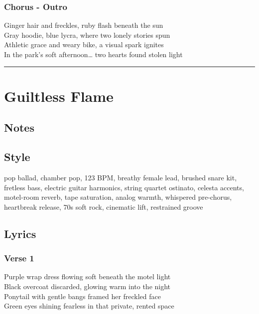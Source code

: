 \subsubsection{Chorus - Outro}\label{chorus---outro-4}

Ginger hair and freckles, ruby flash beneath the sun\\
Gray hoodie, blue lycra, where two lonely stories spun\\
Athletic grace and weary bike, a visual spark ignites\\
In the park's soft afternoon\ldots{} two hearts found stolen light

\begin{center}\rule{0.5\linewidth}{0.5pt}\end{center}

\section{Guiltless Flame}\label{guiltless-flame}

\subsection{Notes}\label{notes-36}

\subsection{Style}\label{style-35}

pop ballad, chamber pop, 123 BPM, breathy female lead, brushed snare
kit, fretless bass, electric guitar harmonics, string quartet ostinato,
celesta accents, motel-room reverb, tape saturation, analog warmth,
whispered pre-chorus, heartbreak release, 70s soft rock, cinematic lift,
restrained groove

\subsection{Lyrics}\label{lyrics-35}

\subsubsection{Verse 1}\label{verse-1-30}

Purple wrap dress flowing soft beneath the motel light\\
Black overcoat discarded, glowing warm into the night\\
Ponytail with gentle bangs framed her freckled face\\
Green eyes shining fearless in that private, rented space

